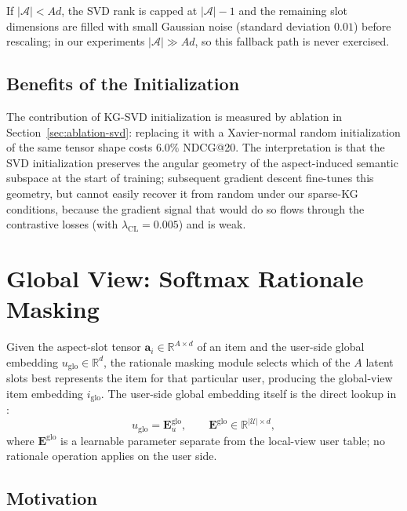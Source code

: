 If $|\mathcal{A}| < A d$, the SVD rank is capped at $|\mathcal{A}| - 1$ and the remaining slot dimensions are filled with small Gaussian noise (standard deviation $0.01$) before rescaling; in our experiments $|\mathcal{A}| \gg A d$, so this fallback path is never exercised.

\subsection{Benefits of the Initialization}
\label{sec:kgsvd-effect}

The contribution of KG-SVD initialization is measured by ablation in Section~\ref{sec:ablation-svd}: replacing it with a Xavier-normal random initialization of the same tensor shape costs $6.0\%$ NDCG@20. The interpretation is that the SVD initialization preserves the angular geometry of the aspect-induced semantic subspace at the start of training; subsequent gradient descent fine-tunes this geometry, but cannot easily recover it from random under our sparse-KG conditions, because the gradient signal that would do so flows through the contrastive losses (with $\lambda_{\mathrm{CL}} = 0.005$) and is weak.

\section{Global View: Softmax Rationale Masking}
\label{sec:softmax}

Given the aspect-slot tensor $\mathbf{a}_i \in \mathbb{R}^{A \times d}$ of an item and the user-side global embedding $u_{\mathrm{glo}} \in \mathbb{R}^d$, the rationale masking module selects which of the $A$ latent slots best represents the item for that particular user, producing the global-view item embedding $i_{\mathrm{glo}}$. The user-side global embedding itself is the direct lookup in :
\begin{equation}
\label{eq:uglo-lookup}
u_{\mathrm{glo}} = \mathbf{E}^{\mathrm{glo}}_u, \qquad \mathbf{E}^{\mathrm{glo}} \in \mathbb{R}^{|\mathcal{U}| \times d},
\end{equation}
where $\mathbf{E}^{\mathrm{glo}}$ is a learnable parameter separate from the local-view user table; no rationale operation applies on the user side.

\subsection{Motivation}
\label{sec:softmax-motivation}

